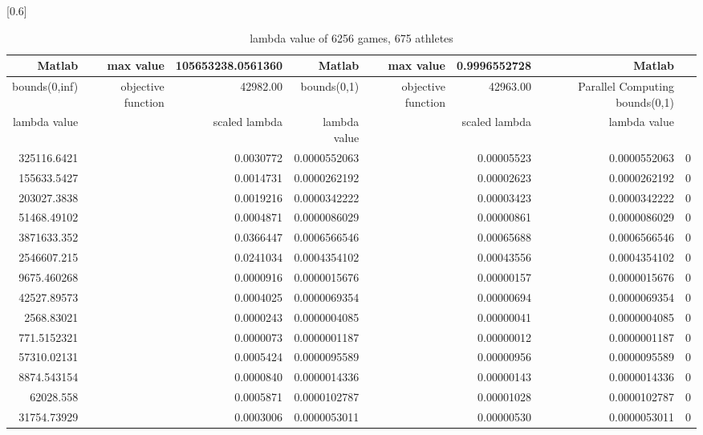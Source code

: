 \documentclass[
journal=jacsat, %
manuscript=article]{achemso}
\begin{document}
\begin{table}[htbp]
  \centering
  \caption{lambda value of 6256 games, 675 athletes}
  \scalebox{0.6}[0.6]{%
    \begin{tabular}{rrrrrrrr}
    \toprule
        Matlab & max value & 105653238.0561360 & Matlab & max value & 0.9996552728 & Matlab \\
    \hline
    bounds(0,inf) & objective function & 42982.00 & bounds(0,1) & objective function & 42963.00 &  Parallel Computing bounds(0,1) \\
    \hline
    lambda value &       & scaled lambda & lambda value  &       & scaled lambda & lambda value  \\
    \bottomrule
    325116.6421 &       & 0.0030772 & 0.0000552063 &       & 0.00005523 & 0.0000552063 & 0 \\
    155633.5427 &       & 0.0014731 & 0.0000262192 &       & 0.00002623 & 0.0000262192 & 0 \\
    203027.3838 &       & 0.0019216 & 0.0000342222 &       & 0.00003423 & 0.0000342222 & 0 \\
    51468.49102 &       & 0.0004871 & 0.0000086029 &       & 0.00000861 & 0.0000086029 & 0 \\
    3871633.352 &       & 0.0366447 & 0.0006566546 &       & 0.00065688 & 0.0006566546 & 0 \\
    2546607.215 &       & 0.0241034 & 0.0004354102 &       & 0.00043556 & 0.0004354102 & 0 \\
    9675.460268 &       & 0.0000916 & 0.0000015676 &       & 0.00000157 & 0.0000015676 & 0 \\
    42527.89573 &       & 0.0004025 & 0.0000069354 &       & 0.00000694 & 0.0000069354 & 0 \\
    2568.83021 &       & 0.0000243 & 0.0000004085 &       & 0.00000041 & 0.0000004085 & 0 \\
    771.5152321 &       & 0.0000073 & 0.0000001187 &       & 0.00000012 & 0.0000001187 & 0 \\
    57310.02131 &       & 0.0005424 & 0.0000095589 &       & 0.00000956 & 0.0000095589 & 0 \\
    8874.543154 &       & 0.0000840 & 0.0000014336 &       & 0.00000143 & 0.0000014336 & 0 \\
    62028.558 &       & 0.0005871 & 0.0000102787 &       & 0.00001028 & 0.0000102787 & 0 \\
    31754.73929 &       & 0.0003006 & 0.0000053011 &       & 0.00000530 & 0.0000053011 & 0 \\

\end{tabular}}
\end{table}
\end{document}
